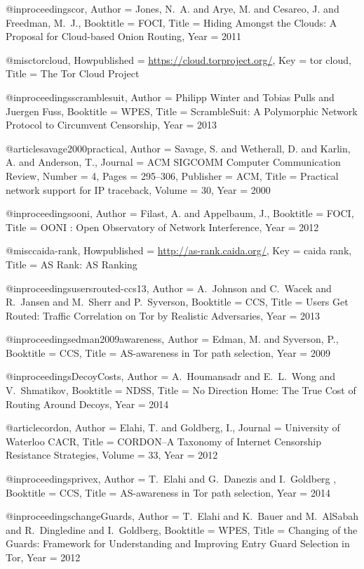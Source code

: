 {{@inproceedings{cor,
	Author = {Jones, N.~A. and Arye, M. and Cesareo, J. and Freedman, M.~J.},
	Booktitle = {FOCI},
	Title = {{Hiding Amongst the Clouds: A Proposal for Cloud-based Onion Routing}},
	Year = {2011}}

@misc{torcloud,
	Howpublished = {\url{https://cloud.torproject.org/}},
	Key = {tor cloud},
	Title = {{The Tor Cloud Project}}}

@inproceedings{scramblesuit,
	Author = {Philipp Winter and Tobias Pulls and Juergen Fuss},
	Booktitle = {WPES},
	Title = {{ScrambleSuit: A Polymorphic Network Protocol to Circumvent Censorship}},
	Year = 2013}

@article{savage2000practical,
	Author = {Savage, S. and Wetherall, D. and Karlin, A. and Anderson, T.},
	Journal = {ACM SIGCOMM Computer Communication Review},
	Number = {4},
	Pages = {295--306},
	Publisher = {ACM},
	Title = {Practical network support for IP traceback},
	Volume = {30},
	Year = {2000}}

@inproceedings{ooni,
	Author = {Filast, A. and Appelbaum, J.},
	Booktitle = {{FOCI}},
	Title = {{OONI : Open Observatory of Network Interference}},
	Year = {2012}}

@misc{caida-rank,
	Howpublished = {\url{http://as-rank.caida.org/}},
	Key = {caida rank},
	Title = {{AS Rank: AS Ranking}}}

@inproceedings{usersrouted-ccs13,
	Author = {A.~Johnson and C.~Wacek and R.~Jansen and M.~Sherr and P.~Syverson},
	Booktitle = {CCS},
	Title = {{Users Get Routed: Traffic Correlation on Tor by Realistic Adversaries}},
	Year = {2013}}

@inproceedings{edman2009awareness,
	Author = {Edman, M. and Syverson, P.},
	Booktitle = {{CCS}},
	Title = {{AS-awareness in Tor path selection}},
	Year = {2009}}

@inproceedings{DecoyCosts,
	Author = {A.~Houmansadr and E.~L.~Wong and V.~Shmatikov},
	Booktitle = {NDSS},
	Title = {{No Direction Home: The True Cost of Routing Around Decoys}},
	Year = {2014}}

@article{cordon,
	Author = {Elahi, T. and Goldberg, I.},
	Journal = {University of Waterloo CACR},
	Title = {{CORDON--A Taxonomy of Internet Censorship Resistance Strategies}},
	Volume = {33},
	Year = {2012}}

@inproceedings{privex,
	Author = {T.~Elahi and G.~Danezis and I.~Goldberg	},
	Booktitle = {{CCS}},
	Title = {{AS-awareness in Tor path selection}},
	Year = {2014}}

@inproceedings{changeGuards,
	Author = {T.~Elahi and K.~Bauer and M.~AlSabah and R.~Dingledine and I.~Goldberg},
	Booktitle = {{WPES}},
	Title = {{ Changing of the Guards: Framework for Understanding and Improving Entry Guard Selection in Tor}},
	Year = {2012}}

}}
